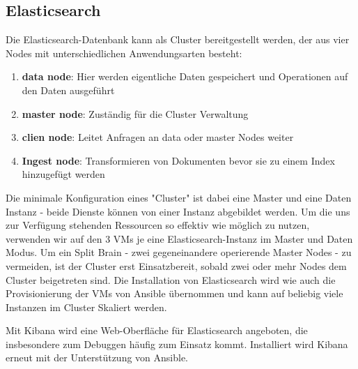 \subsection{Elasticsearch}
Die Elasticsearch-Datenbank kann als Cluster bereitgestellt werden, der aus vier Nodes mit unterschiedlichen Anwendungsarten besteht:
\begin{enumerate}
        \item \textbf{data node}: Hier werden eigentliche Daten gespeichert und Operationen auf den Daten ausgeführt
        \item \textbf{master node}: Zuständig für die Cluster Verwaltung
        \item \textbf{clien node}: Leitet Anfragen an data oder master Nodes weiter
        \item \textbf{Ingest node}: Transformieren von Dokumenten bevor sie zu einem Index hinzugefügt werden
\end{enumerate}
Die minimale Konfiguration eines "Cluster" ist dabei eine Master und eine Daten Instanz - beide Dienste können von einer Instanz abgebildet werden.
Um die uns zur Verfügung stehenden Ressourcen so effektiv wie möglich zu nutzen, verwenden wir auf den 3 VMs je eine Elasticsearch-Instanz im Master und Daten Modus.
Um ein Split Brain - zwei gegeneinandere operierende Master Nodes - zu vermeiden, ist der Cluster erst Einsatzbereit, sobald zwei oder mehr Nodes dem Cluster beigetreten sind.
Die Installation von Elasticsearch wird wie auch die Provisionierung der VMs von Ansible übernommen und kann auf beliebig viele Instanzen im Cluster Skaliert werden.

Mit Kibana \cite{esk} wird eine Web-Oberfläche für Elasticsearch angeboten, die insbesondere zum Debuggen häufig zum Einsatz kommt.
Installiert wird Kibana erneut mit der Unterstützung von Ansible.
